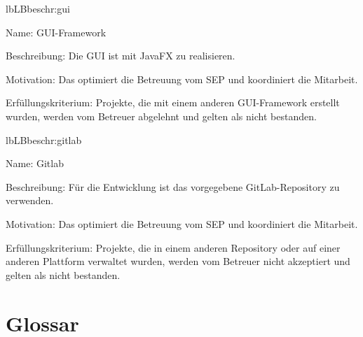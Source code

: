 \begin{description}[leftmargin=5em, style=sameline]
	\begin{lhp}{lb}{LB}{beschr:gui}
		\item [Name:] GUI-Framework
		\item [Beschreibung:] Die GUI ist mit JavaFX zu realisieren.
		\item [Motivation:] Das optimiert die Betreuung vom SEP und koordiniert die Mitarbeit.
		\item [Erfüllungskriterium:] Projekte, die mit einem anderen GUI-Framework erstellt wurden, werden vom Betreuer abgelehnt und gelten als nicht bestanden.
	\end{lhp}
	
	\begin{lhp}{lb}{LB}{beschr:gitlab}
		\item [Name:] Gitlab
		\item [Beschreibung:] Für die Entwicklung ist das vorgegebene GitLab-Repository zu verwenden.
		\item [Motivation:] Das optimiert die Betreuung vom SEP und koordiniert die Mitarbeit.
		\item [Erfüllungskriterium:] Projekte, die in einem anderen Repository oder auf einer anderen Plattform verwaltet wurden, werden vom Betreuer nicht akzeptiert und gelten als nicht bestanden.
	\end{lhp}
	
	
\end{description}

\section{Glossar}


